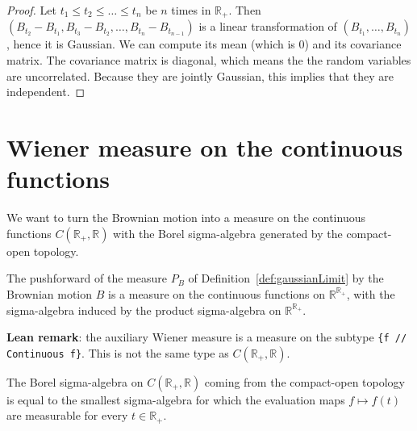 \begin{proof}\leanok
Let $t_1 \le t_2 \le \ldots \le t_n$ be $n$ times in $\mathbb{R}_+$.
Then $(B_{t_2} - B_{t_1}, B_{t_3} - B_{t_2}, \ldots, B_{t_n} - B_{t_{n-1}})$ is a linear transformation of $(B_{t_1}, \ldots, B_{t_n})$, hence it is Gaussian.
We can compute its mean (which is $0$) and its covariance matrix.
The covariance matrix is diagonal, which means the the random variables are uncorrelated.
Because they are jointly Gaussian, this implies that they are independent.
\end{proof}


\section{Wiener measure on the continuous functions}

We want to turn the Brownian motion into a measure on the continuous functions $C(\mathbb{R}_+, \mathbb{R})$ with the Borel sigma-algebra generated by the compact-open topology.


\begin{definition}\label{def:wienerMeasureAux}
  \leanok
The pushforward of the measure $P_B$ of Definition~\ref{def:gaussianLimit} by the Brownian motion $B$ is a measure on the continuous functions on $\mathbb{R}^{\mathbb{R}_+}$, with the sigma-algebra induced by the product sigma-algebra on $\mathbb{R}^{\mathbb{R}_+}$.
\end{definition}

\textbf{Lean remark}: the auxiliary Wiener measure is a measure on the subtype \texttt{\{f  // Continuous f\}}. This is not the same type as $C(\mathbb{R}_+, \mathbb{R})$.


\begin{theorem}\label{thm:ContinuousMap.borel_eq_iSup_comap_eval}
  \leanok
The Borel sigma-algebra on $C(\mathbb{R}_+, \mathbb{R})$ coming from the compact-open topology is equal to the smallest sigma-algebra for which the evaluation maps $f \mapsto f(t)$ are measurable for every $t \in \mathbb{R}_+$.
\end{theorem}


